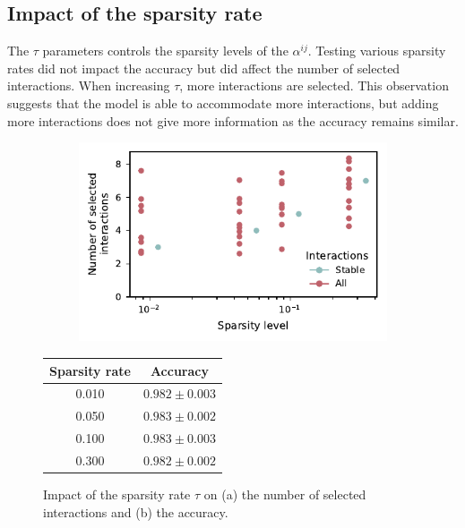 \documentclass[../main.tex]{subfiles}
\begin{document}
 \subsection{Impact of the sparsity rate}

     The \(\tau\) parameters controls the sparsity levels of the \(\alpha^{ij}\).
     Testing various sparsity rates did not impact the accuracy but did affect the number of selected interactions.
     When increasing \(\tau\), more interactions are selected.
     This observation suggests that the model is able to accommodate more interactions, but adding more interactions does not give more information as the accuracy remains similar.

     \begin{figure}[htbp]
         \begin{subfigure}[c]{0.62\textwidth}
             \centering
             \caption{}
             \includegraphics[width=\linewidth]{sparsity_stability.pdf}
             \label{fig:sparsity_stability}
         \end{subfigure}
         \hfill
         \begin{subtable}[c]{0.33\textwidth}
             \centering
             \caption{}
             \begin{tabular}{cc}
                 \toprule
                 Sparsity rate & Accuracy          \\
                 \midrule
                 0.010         & $0.982 \pm 0.003$ \\
                 0.050         & $0.983 \pm 0.002$ \\
                 0.100         & $0.983 \pm 0.003$ \\
                 0.300         & $0.982 \pm 0.002$ \\
                 \bottomrule
             \end{tabular}
             \label{tab:acc_sparsity}
         \end{subtable}
         \caption{Impact of the sparsity rate \(\tau\) on (a) the number of selected interactions and (b) the accuracy.}
     \end{figure}
\end{document}
